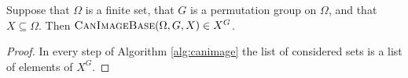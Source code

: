 \begin{algorithm}
  \caption{$\textsc{CanImage}$}\label{alg:canimage}
  \begin{algorithmic}[1]
    \label{line:if}
    \EndIf\label{line:endif}
    \State{}
    \EndProcedure{}
  \end{algorithmic}


  \begin{algorithmic}[2]
    \State{}
  \EndProcedure{}
  \end{algorithmic}
\end{algorithm}

\begin{thm}\label{thm:canorb}
Suppose that $\Omega$ is a finite set, that $G$ is a permutation group on $\Omega$, and
 that $X \subseteq \Omega$. Then $\textsc{CanImageBase}(\Omega,G,X) \in X^G$.
\end{thm}
\begin{proof}
  In every step of Algorithm \ref{alg:canimage} the list of considered sets is
  a list of elements of $X^G$.
\end{proof}

